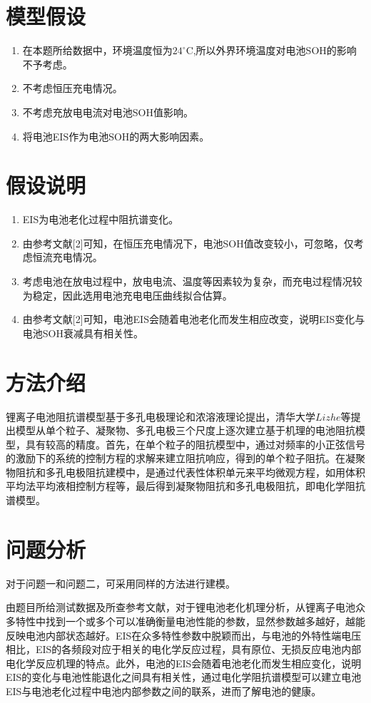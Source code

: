 \documentclass{cumcm}
\begin{document}
\section{模型假设}
\begin{enumerate}
\item 在本题所给数据中，环境温度恒为$24^\circ$C,所以外界环境温度对电池SOH的影响不予考虑。
\item 不考虑恒压充电情况。
\item 不考虑充放电电流对电池SOH值影响。
\item 将电池EIS作为电池SOH的两大影响因素。
\end{enumerate}
\section{假设说明}
\begin{enumerate}
\item EIS为电池老化过程中阻抗谱变化。
\item 由参考文献[2]可知，在恒压充电情况下，电池SOH值改变较小，可忽略，仅考虑恒流充电情况。
\item 考虑电池在放电过程中，放电电流、温度等因素较为复杂，而充电过程情况较为稳定，因此选用电池充电电压曲线拟合估算。
\item 由参考文献[2]可知，电池EIS会随着电池老化而发生相应改变，说明EIS变化与电池SOH衰减具有相关性。
\end{enumerate}

\section{方法介绍}
锂离子电池阻抗谱模型基于多孔电极理论和浓溶液理论提出，清华大学$Li zhe$等提出模型从单个粒子、凝聚物、多孔电极三个尺度上逐次建立基于机理的电池阻抗模型，具有较高的精度。首先，在单个粒子的阻抗模型中，通过对频率的小正弦信号的激励下的系统的控制方程的求解来建立阻抗响应，得到的单个粒子阻抗。在凝聚物阻抗和多孔电极阻抗建模中，是通过代表性体积单元来平均微观方程，如用体积平均法平均液相控制方程等，最后得到凝聚物阻抗和多孔电极阻抗，即电化学阻抗谱模型。
\section{问题分析}
对于问题一和问题二，可采用同样的方法进行建模。\par
由题目所给测试数据及所查参考文献，对于锂电池老化机理分析，从锂离子电池众多特性中找到一个或多个可以准确衡量电池性能的参数，显然参数越多越好，越能反映电池内部状态越好。EIS在众多特性参数中脱颖而出，与电池的外特性端电压相比，EIS的各频段对应于相关的电化学反应过程，具有原位、无损反应电池内部电化学反应机理的特点。此外，电池的EIS会随着电池老化而发生相应变化，说明EIS的变化与电池性能退化之间具有相关性，通过电化学阻抗谱模型可以建立电池EIS与电池老化过程中电池内部参数之间的联系，进而了解电池的健康。\cite{1}
\end{document}
